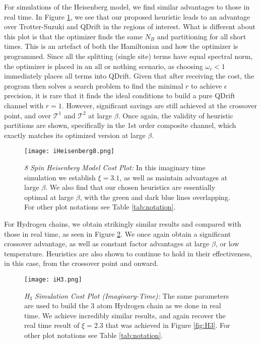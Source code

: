 For simulations of the Heisenberg model, we find similar advantages to those in real time. In Figure \ref{fig:imag_sim}, we see that our proposed heuristic leads to an advantage over Trotter-Suzuki and QDrift in the regions of interest. What is different about this plot is that the optimizer finds the same $N_B$ and partitioning for all short times. This is an artefact of both the Hamiltonian and how the optimizer is programmed. Since all the splitting (single site) terms have equal spectral norm, the optimizer is placed in an all or nothing scenario, as choosing $\omega_c < 1$ immediately places all terms into QDrift. Given that after receiving the cost, the program then solves a search problem to find the minimal $r$ to achieve $\epsilon$ precision, it is rare that it finds the ideal conditions to build a pure QDrift channel with $r=1$. However, significant savings are still achieved at the crossover point, and over $\mathcal{T}^1$ and $\mathcal{T}^2$ at large $\beta$. Once again, the validity of heuristic partitions are shown, specifically in the 1st order composite channel, which exactly matches its optimized version at large $\beta$. \\

\begin{figure}[htbp!]
    \centering
    \texttt{[image: iHeisenberg8.png]}
    \caption{\textit{8 Spin Heisenberg Model Cost Plot:} In this imaginary time simulation we establish $\xi = 3.1$, as well as maintain advantages at large $\beta$. We also find that our chosen heuristics are essentially optimal at large $\beta$, with the green and dark blue lines overlapping. For other plot notations see Table \ref{tab:notation}.} \label{fig:imag_sim}
\end{figure} 
\FloatBarrier


For Hydrogen chains, we obtain strikingly similar results and compared with those in real time, as seen in Figure \ref{fig:iH3}. We once again obtain a significant crossover advantage, as well as constant factor advantages at large $\beta$, or low temperature. Heuristics are also shown to continue to hold in their effectiveness, in this case, from the crossover point and onward.

\begin{figure}[htbp!]
    \centering
    \texttt{[image: iH3.png]}
    \caption{\textit{H$_3$ Simulation Cost Plot (Imaginary-Time):} The same parameters are used to build the 3 atom Hydrogen chain as we done in real time. We achieve incredibly similar results, and again recover the real time result of $\xi = 2.3$ that was achieved in Figure \ref{fig:H3}. For other plot notations see Table \ref{tab:notation}.} \label{fig:iH3}
\end{figure} 
\FloatBarrier

